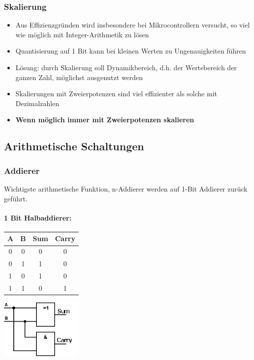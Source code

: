 \subsubsection{Skalierung}
\begin{itemize}
	\item Aus Effizienzgründen wird insbesondere bei Mikrocontrollern versucht, so viel wie möglich mit Integer-Arithmetik zu lösen
	\item Quantisierung auf 1 Bit kann bei kleinen Werten zu Ungenauigkeiten führen
	\item Lösung: durch Skalierung soll Dynamikbereich, d.h. der Wertebereich der ganzen Zahl, möglichst ausgenutzt werden
	\item Skalierungen mit Zweierpotenzen sind viel effizienter als solche mit Dezimalzahlen
	\item \textbf{Wenn möglich immer mit Zweierpotenzen skalieren}
\end{itemize}

\subsection{Arithmetische Schaltungen}
\subsubsection{Addierer}
Wichtigste arithmetische Funktion, n-Addierer werden auf 1-Bit Addierer zurück geführt.
\paragraph{1 Bit Halbaddierer:}
\begin{minipage}{0.5\textwidth}
	\centering
	\begin{tabular}{|c | c | c | c |}
		\hline
		A & B & Sum & Carry\\
		\hline
		0 & 0 & 0 & 0\\
		\hline
		0 & 1 & 1 & 0\\
		\hline
		1 & 0 & 1 & 0\\
		\hline
		1 & 1 & 0 & 1\\
		\hline
	\end{tabular}
\end{minipage}
\begin{minipage}{0.9\textwidth}
	\centering
	\begin{flushleft}
		{\includegraphics[width=0.3\textwidth]{images/Arithmetik/halbaddierer.png}}
	\end{flushleft}
\end{minipage}\\ \\

